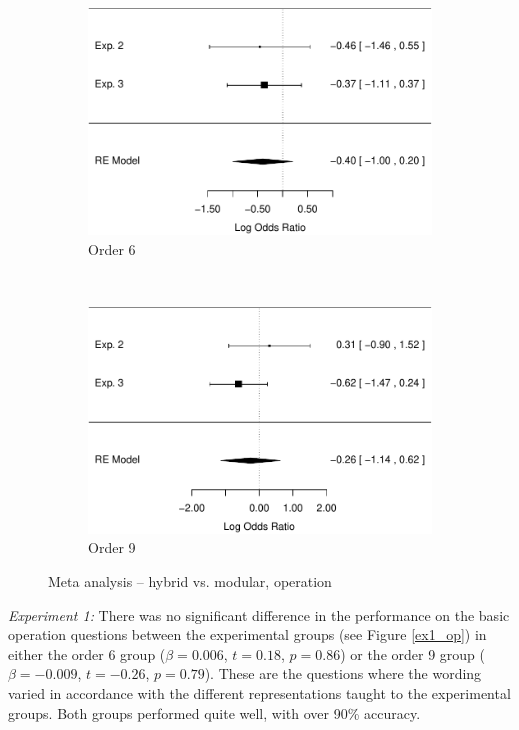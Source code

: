 \documentclass[man,10pt]{apa6}
\begin{document}
\begin{figure}[t]
\centering
\begin{subfigure}[c]{0.4\textwidth}
\centering
\includegraphics[width=\textwidth]{figures/meta/conditionhybrid.pdf}
\caption{Order 6}
\end{subfigure}
~
\begin{subfigure}[c]{0.4\textwidth}
\centering
\includegraphics[width=\textwidth]{figures/meta/question_typeoperation_9_conditionhybrid.pdf}
\caption{Order 9}
\end{subfigure}
\caption{Meta analysis -- hybrid vs. modular, operation}
\label{meta_op_h}
\end{figure}\noindent 
\textit{Experiment 1:} There was no significant difference in the performance on the basic operation questions between the experimental groups (see Figure \ref{ex1_op}) in either the order 6 group ($\beta = 0.006$, $t = 0.18$, $p = 0.86$) or the order 9 group ($\beta = -0.009$, $t = -0.26$, $p = 0.79$). These are the questions where the wording varied in accordance with the different representations taught to the experimental groups. Both groups performed quite well, with over 90\% accuracy. \par 
\end{document}
